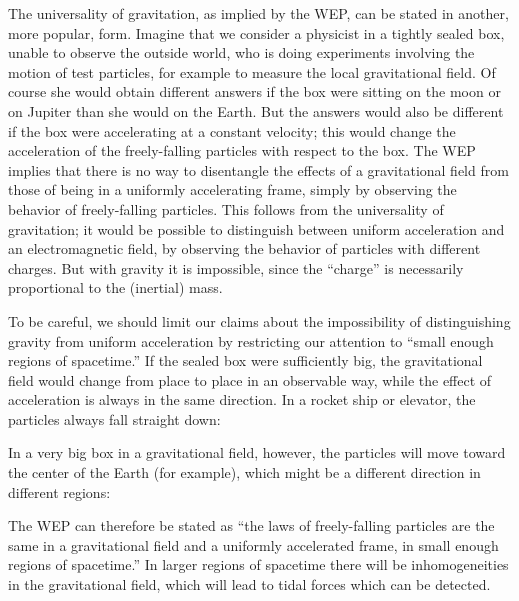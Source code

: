 The universality of gravitation, as implied by the WEP, can be stated
in another, more popular, form.  Imagine that we consider a physicist
in a tightly sealed box, unable to observe the outside world, who is
doing experiments involving the motion of test particles, for example
to measure the local gravitational field.  Of course she would obtain
different answers if the box were sitting on the moon or
on Jupiter than she would on the Earth.  But the answers would also
be different if the box were accelerating at a constant velocity;
this would change the acceleration of the freely-falling particles
with respect to the box.  The WEP implies that there is no way to
disentangle the effects of a gravitational field from those of being
in a uniformly accelerating frame, simply by observing the behavior
of freely-falling particles.  This follows from the universality of
gravitation; it would be possible to distinguish between uniform
acceleration and an electromagnetic field, by observing the behavior
of particles with different charges.  But with gravity it is 
impossible, since the ``charge'' is necessarily proportional to the
(inertial) mass.

To be careful, we should limit our claims about the impossibility of
distinguishing gravity from uniform acceleration by restricting our
attention to ``small enough regions of spacetime.''  If the sealed
box were sufficiently big, the gravitational field would change from
place to place in an observable way, while the effect of acceleration
is always in the same direction.  In a rocket ship or elevator, the
particles always fall straight down:

\begin{figure}[h]
  \centerline{
  }
\end{figure}

\noindent In a very big box in a gravitational field, however, the
particles will move toward the center of the Earth (for example), which
might be a different direction in different regions:

\eject

\begin{figure}
  \centerline{
  }
\end{figure}

\noindent The WEP can therefore be stated as ``the laws of freely-falling
particles are the same in a gravitational field and a uniformly
accelerated frame, in small enough regions of spacetime.''  In larger
regions of spacetime there will be inhomogeneities in the gravitational
field, which will lead to tidal forces which can be detected.

